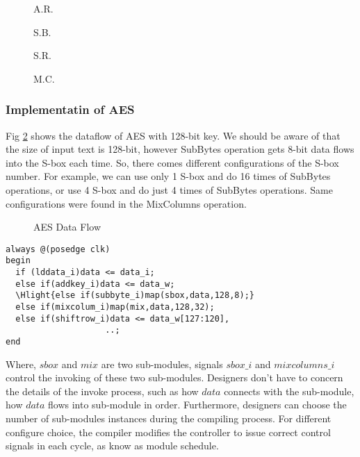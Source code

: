 %
%
%
\begin{figure}[h]
  \centering
  \begin{minipage}{0.4\linewidth}
     \centering
     \caption{A.R.}
     \label{fig-addroundkey}
  \end{minipage}
  \begin{minipage}{0.4\linewidth}
     \centering
     \caption{S.B.}
     \label{fig-subbytes}
  \end{minipage}
  \begin{minipage}{0.4\linewidth}
     \centering
     \caption{S.R.}
     \label{fig-shiftrows}
  \end{minipage}
  \begin{minipage}{0.4\linewidth}
     \centering
     \caption{M.C.}
     \label{fig-mixcolumns}
  \end{minipage}
\end{figure}
\subsubsection{Implementatin of AES}
Fig \ref{fig-aesdatapath} shows the dataflow of AES with 128-bit key. We should be aware of that the size of input text is 128-bit, however SubBytes operation gets 8-bit data flows into the S-box each time. So, there comes different configurations of the S-box number. For example, we can use only 1 S-box and do 16 times of SubBytes operations, or use 4 S-box and do just 4 times of SubBytes operations. Same configurations were found in the MixColumns operation.
\begin{figure}[h]
  \centering
  \caption{AES Data Flow}
  \label{fig-aesdatapath}
\end{figure}
\begin{Verbatim}[commandchars=\\\{\}]
always @(posedge clk)
begin
  if (lddata_i)data <= data_i;
  else if(addkey_i)data <= data_w;
  \Hlight{else if(subbyte_i)map(sbox,data,128,8);}
  else if(mixcolum_i)map(mix,data,128,32);
  else if(shiftrow_i)data <= data_w[127:120],
                    ..;
end
\end{Verbatim}
%
Where, $sbox$ and $mix$ are two sub-modules, signals $sbox\_i$ and $mixcolumns\_i$ control the invoking of these two sub-modules. Designers don't have to concern the details of the invoke process, such as how $data$ connects with the sub-module, how $data$ flows into sub-module in order. Furthermore, designers can choose the number of sub-modules instances during the compiling process. For different configure choice, the compiler modifies the controller to issue correct control signals in each cycle, as know as  module schedule.

